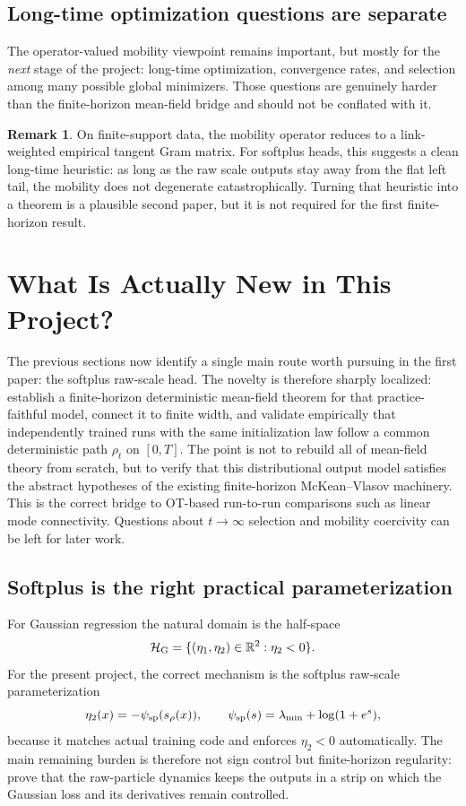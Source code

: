 \documentclass[11pt]{article}
\theoremstyle{definition}
\newtheorem{remark}[theorem]{Remark}
\newcommand{\R}{\mathbb{R}}
\newcommand{\mc}[1]{\mathcal{#1}}
\begin{document}
\subsection{Long-time optimization questions are separate}

The operator-valued mobility viewpoint remains important, but mostly for the
\emph{next} stage of the project: long-time optimization, convergence rates, and
selection among many possible global minimizers. Those questions are genuinely
harder than the finite-horizon mean-field bridge and should not be conflated
with it.

\begin{remark}
On finite-support data, the mobility operator reduces to a link-weighted
empirical tangent Gram matrix. For softplus heads, this suggests a clean
long-time heuristic: as long as the raw scale outputs stay away from the flat
left tail, the mobility does not degenerate catastrophically. Turning that
heuristic into a theorem is a plausible second paper, but it is not required for
the first finite-horizon result.
\end{remark}

\section{What Is Actually New in This Project?}

The previous sections now identify a single main route worth pursuing in the
first paper: the softplus raw-scale head. The novelty is therefore sharply
localized: establish a finite-horizon deterministic mean-field theorem for that
practice-faithful model, connect it to finite width, and validate empirically
that independently trained runs with the same initialization law follow a common
deterministic path $\rho_t$ on $[0,T]$. The point is not to rebuild all of
mean-field theory from scratch, but to verify that this distributional output
model satisfies the abstract hypotheses of the existing finite-horizon
McKean--Vlasov machinery. This is the correct bridge to OT-based run-to-run
comparisons such as linear mode connectivity. Questions about $t\to\infty$
selection and mobility coercivity can be left for later work.

\subsection{Softplus is the right practical parameterization}

For Gaussian regression the natural domain is the half-space
\[
  \mc{H}_{\rm G} = \{(\eta_1,\eta_2)\in \R^2 : \eta_2<0\}.
\]
For the present project, the correct mechanism is the softplus raw-scale
parameterization
\[
  \eta_2(x) = -\psi_{\rm sp}(s_\rho(x)),
  \qquad
  \psi_{\rm sp}(s)=\lambda_{\min}+\log(1+e^s),
\]
because it matches actual training code and enforces $\eta_2<0$ automatically.
The main remaining burden is therefore not sign control but finite-horizon
regularity: prove that the raw-particle dynamics keeps the outputs in a strip on
which the Gaussian loss and its derivatives remain controlled.
\end{document}
